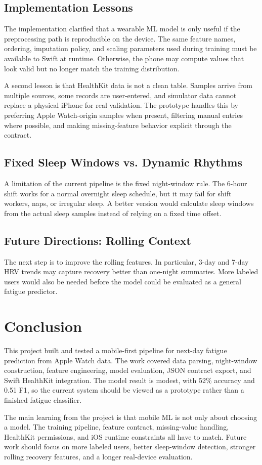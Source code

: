 \documentclass[sigconf,10pt]{acmart}
\begin{document}
\subsection{Implementation Lessons}
The implementation clarified that a wearable ML model is only useful if the preprocessing path is reproducible on the device. The same feature names, ordering, imputation policy, and scaling parameters used during training must be available to Swift at runtime. Otherwise, the phone may compute values that look valid but no longer match the training distribution.

A second lesson is that HealthKit data is not a clean table. Samples arrive from multiple sources, some records are user-entered, and simulator data cannot replace a physical iPhone for real validation. The prototype handles this by preferring Apple Watch-origin samples when present, filtering manual entries where possible, and making missing-feature behavior explicit through the contract.

\subsection{Fixed Sleep Windows vs. Dynamic Rhythms}
A limitation of the current pipeline is the fixed night-window rule. The 6-hour shift works for a normal overnight sleep schedule, but it may fail for shift workers, naps, or irregular sleep. A better version would calculate sleep windows from the actual sleep samples instead of relying on a fixed time offset.

\subsection{Future Directions: Rolling Context}
The next step is to improve the rolling features. In particular, 3-day and 7-day HRV trends may capture recovery better than one-night summaries. More labeled users would also be needed before the model could be evaluated as a general fatigue predictor.

\section{Conclusion}

This project built and tested a mobile-first pipeline for next-day fatigue prediction from Apple Watch data. The work covered data parsing, night-window construction, feature engineering, model evaluation, JSON contract export, and Swift HealthKit integration. The model result is modest, with 52\% accuracy and 0.51 F1, so the current system should be viewed as a prototype rather than a finished fatigue classifier.

The main learning from the project is that mobile ML is not only about choosing a model. The training pipeline, feature contract, missing-value handling, HealthKit permissions, and iOS runtime constraints all have to match. Future work should focus on more labeled users, better sleep-window detection, stronger rolling recovery features, and a longer real-device evaluation.



\end{document}

